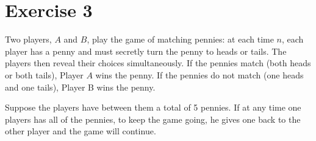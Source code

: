 \documentclass[12pt, a4paper]{article} %
\begin{document}

\section*{Exercise 3}%
\label{sec:exercise_3}

Two players, $A$ and $B$, play the game of matching pennies: at each time $n$, each player has a penny and must secretly turn the penny to heads or tails. The players then reveal their choices simultaneously. If the pennies match (both heads or both tails), Player $A$ wins the penny. If the pennies do not match (one heads and one tails), Player B wins the penny.

Suppose the players have between them a total of 5 pennies. If at any time one players has all of the pennies, to keep the game going, he gives one back to the other player and the game will continue.
\end{document}
